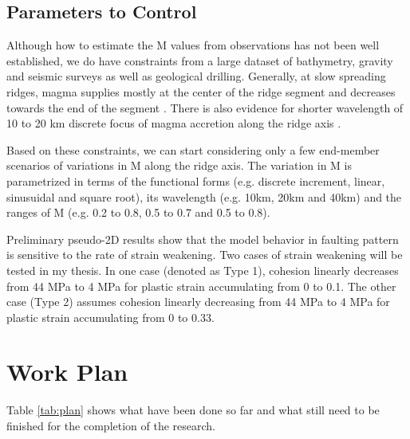 \documentclass[12pt]{article}
\begin{document}
\subsection{Parameters to Control}

Although how to estimate the M values from observations has not been well established, we do have constraints from a large dataset of bathymetry, gravity and seismic surveys as well as geological drilling. Generally, at slow spreading ridges, magma supplies mostly at the center of the ridge segment and decreases towards the end of the segment \citep{Tolstoy1993,Chen1999}. There is also evidence for shorter wavelength of 10 to 20 km discrete focus of magma accretion along the ridge axis \citep{Lin1990}. 

Based on these constraints, we can start considering only a few end-member scenarios of variations in M along the ridge axis. The variation in M is parametrized in terms of the functional forms (e.g. discrete increment, linear, sinusuidal and square root), its wavelength (e.g. 10km, 20km and 40km) and the ranges of M (e.g. 0.2 to 0.8, 0.5 to 0.7 and 0.5 to 0.8). 

Preliminary pseudo-2D results show that the model behavior in faulting pattern is sensitive to the rate of strain weakening. Two cases of strain weakening will be tested in my thesis. In one case (denoted as Type 1), cohesion linearly decreases from 44 MPa to 4 MPa for plastic strain accumulating from 0 to 0.1. The other case (Type 2) assumes cohesion linearly decreasing from 44 MPa to 4 MPa for plastic strain accumulating from 0 to 0.33.




\break
\section{Work Plan}
\label{ch:plan}

Table \ref{tab:plan} shows what have been done so far and what still need to be finished for the completion of the research.
\end{document}
